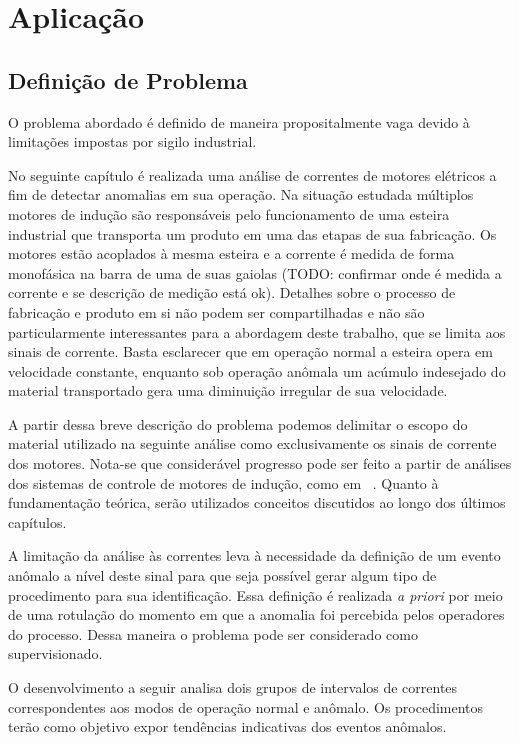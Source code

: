 \chapter{Aplicação}
\label{chap:aplicacoes}

\section{Definição de Problema}

O problema abordado é definido de maneira propositalmente vaga devido à
limitações impostas por sigilo industrial.

No seguinte capítulo é realizada uma análise de correntes de motores elétricos
a fim de detectar anomalias em sua operação. Na situação estudada múltiplos
motores de indução são responsáveis pelo funcionamento de uma esteira
industrial que transporta um produto em uma das etapas de sua fabricação. Os
motores estão acoplados à mesma esteira e a corrente é medida de forma
monofásica na barra de uma de suas gaiolas (TODO: confirmar onde é medida a
corrente e se descrição de medição está ok). Detalhes sobre o processo de
fabricação e produto em si não podem ser compartilhadas e não são
particularmente interessantes para a abordagem deste trabalho, que se limita
aos sinais de corrente. Basta esclarecer que em operação normal a esteira opera
em velocidade constante, enquanto sob operação anômala um acúmulo indesejado do
material transportado gera uma diminuição irregular de sua velocidade.

A partir dessa breve descrição do problema podemos delimitar o escopo do
material utilizado na seguinte análise como exclusivamente os sinais de
corrente dos motores. Nota-se que considerável progresso pode ser feito a
partir de análises dos sistemas de controle de motores de indução, como em
~\cite{}. Quanto à fundamentação teórica, serão utilizados conceitos discutidos
ao longo dos últimos capítulos.

A limitação da análise às correntes leva à necessidade da definição de um
evento anômalo a nível deste sinal para que seja possível gerar algum tipo de
procedimento para sua identificação. Essa definição é realizada \emph{a priori}
por meio de uma rotulação do momento em que a anomalia foi percebida pelos
operadores do processo. Dessa maneira o problema pode ser considerado como
supervisionado.

O desenvolvimento a seguir analisa dois grupos de intervalos de correntes
correspondentes aos modos de operação normal e anômalo. Os procedimentos
terão como objetivo expor tendências indicativas dos eventos anômalos.

